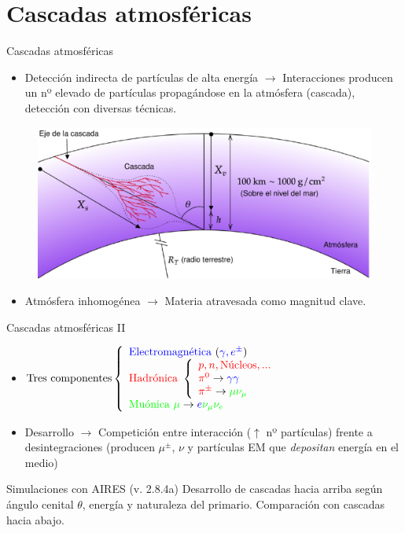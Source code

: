 \documentclass{beamer}
\begin{document}
	\section{Cascadas atmosféricas}
	\begin{frame}{Cascadas atmosféricas}
		\begin{itemize}
			\item Detección indirecta de partículas de alta energía $\rightarrow$ Interacciones producen un nº elevado de partículas propagándose en la atmósfera (cascada), detección con diversas técnicas.
		\end{itemize}
			\begin{figure}[H]
				\centering
				\includegraphics[width=.7\linewidth]{figures/cascadas/shower_params_v2}
			\end{figure}
		\begin{itemize}
			\item Atmósfera inhomogénea $\rightarrow$ Materia atravesada como magnitud clave. 
		\end{itemize}
	\end{frame}
\begin{frame}{Cascadas atmosféricas II}
	\begin{itemize}
		\item $\text{Tres componentes}\left\{\begin{array}{l}\text{\color{blue}Electromagnética } ({\color{blue}\gamma, e^\pm})\\\text{\color{red}Hadrónica }\left\{\begin{array}{l}\color{red} p, n, \text{Núcleos}, ...\\\color{red}\pi^0\color{black}\rightarrow\color{blue}\gamma\gamma\\\color{red}\pi^\pm\color{black}\rightarrow\color{green}\mu\nu_\mu\end{array}\right. \\\text{\color{green}Muónica } \color{green}\mu\color{black}\rightarrow\color{blue}e\color{green}\nu_\mu\nu_e\end{array}\right.$
		\color{black}
		\item Desarrollo $\rightarrow$ Competición entre interacción ($\uparrow$ nº partículas) frente a desintegraciones (producen $\mu^\pm$, $\nu$ y partículas EM que \textit{depositan} energía en el medio)
	\end{itemize}
\pause\begin{block}{\centering Simulaciones con AIRES (v. 2.8.4a)}
	\centering Desarrollo de cascadas hacia arriba según ángulo cenital $\theta$, energía y naturaleza del primario. Comparación con cascadas hacia abajo.
\end{block}
\end{frame}
\end{document}
